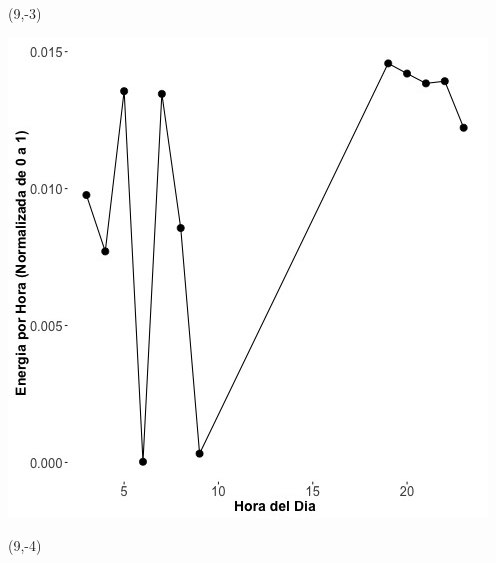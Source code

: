 \documentclass{article}\usepackage[]{graphicx}\usepackage[]{color}
\newenvironment{knitrout}{}{} %
\begin{document}
 \begin{textblock}{1}(9,-3)
\begin{minipage}{20em}
\begingroup

\endgroup
\end{minipage}
\end{textblock}

 \vspace{2cm}

\begin{knitrout}
\color{fgcolor}
\includegraphics[scale=0.75]{figure/A21_fplot_norm_median} 
\end{knitrout}


 \begin{textblock}{1}(9,-4)
\begin{minipage}{20em}
\begingroup

\endgroup
\end{minipage}
\end{textblock}

 \vspace{2cm}
\end{document}
